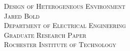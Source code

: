 \begin{titlepage}

  \begin{center}
    \textsc{\LARGE Design of Heterogeneous Environment}
    \\
    \textsc{Jared Bold}
    \\
    \textsc{Department of Electrical Engineering}
    \\
    \textsc{Graduate Research Paper}
    \\
    \textsc{Rochester Institute of Technology}
  \end{center}

\end{titlepage}
